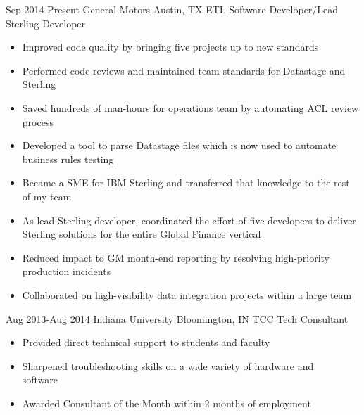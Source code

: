\documentclass[]{friggeri-cv} %
\begin{document}
 \begin{entrylist}
   \entry
     {Sep 2014-Present}
     {General Motors}
     {Austin, TX}
     {ETL Software Developer/Lead Sterling Developer}
     {\begin{itemize}
         \item Improved code quality by bringing five projects up to new standards 
         \item Performed code reviews and maintained team standards for Datastage and Sterling
         \item Saved hundreds of man-hours for operations team by automating ACL review process
         \item Developed a tool to parse Datastage files which is now used to automate business rules testing
         \item Became a SME for IBM Sterling and transferred that knowledge to the rest of my team
         \item As lead Sterling developer, coordinated the effort of five developers to deliver Sterling solutions for the entire Global Finance vertical
         \item Reduced impact to GM month-end reporting by resolving high-priority production incidents
         \item Collaborated on high-visibility data integration projects within a large team
         

     \end{itemize}}
   \entry
     {Aug 2013-Aug 2014}
     {Indiana University}
     {Bloomington, IN}
     {TCC Tech Consultant}
     {\begin{itemize}
        \item Provided direct technical support to students and faculty
        \item Sharpened troubleshooting skills on a wide variety of hardware and \\software
        \item Awarded Consultant of the Month within 2 months of employment
     \end{itemize}
     }
 \end{entrylist}
\end{document}
